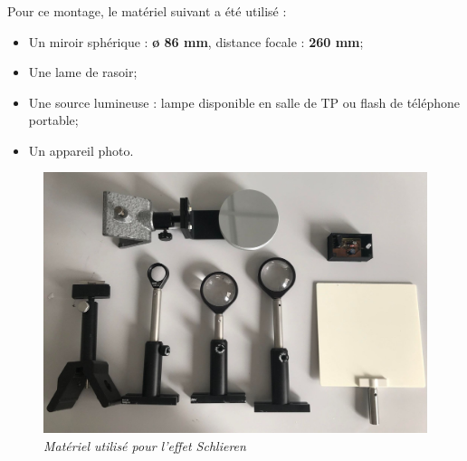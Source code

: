 \subsubsection{\large{}}
Pour ce montage, le matériel suivant a été utilisé :
\begin{itemize}
	\item Un miroir sphérique : \textbf{ø 86 mm}, distance focale : \textbf{260 mm};
	\item Une lame de rasoir;
	\item Une source lumineuse : lampe disponible en salle de TP ou flash de téléphone portable;
	\item Un appareil photo.
\end{itemize}
\begin{figure}[H]
	\centering
	\includegraphics[scale = 0.12]{figures/materiel.jpg}
	\caption{\small{\textit{Matériel utilisé pour l'effet Schlieren}}}
	\label{fig:materiel}
\end{figure}
